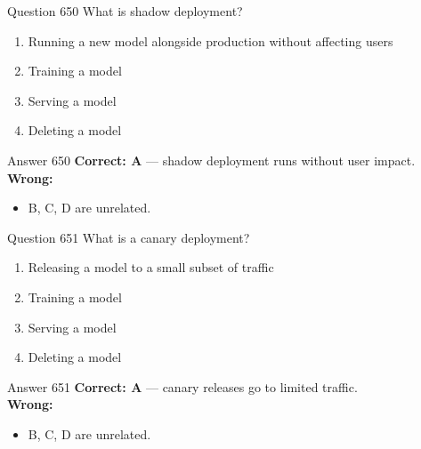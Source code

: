 \documentclass[aspectratio=169,11pt]{beamer}
\begin{document}
	\begin{frame}{Question 650}
		What is shadow deployment?
		\begin{enumerate}[label=\Alph*.]
			\item Running a new model alongside production without affecting users
			\item Training a model
			\item Serving a model
			\item Deleting a model
		\end{enumerate}
	\end{frame}
	\begin{frame}{Answer 650}
		\textbf{Correct: A} --- shadow deployment runs without user impact.\\
		\vspace{0.5em}
		\textbf{Wrong:}
		\begin{itemize}
			\item B, C, D are unrelated.
		\end{itemize}
	\end{frame}
	
	\begin{frame}{Question 651}
		What is a canary deployment?
		\begin{enumerate}[label=\Alph*.]
			\item Releasing a model to a small subset of traffic
			\item Training a model
			\item Serving a model
			\item Deleting a model
		\end{enumerate}
	\end{frame}
	\begin{frame}{Answer 651}
		\textbf{Correct: A} --- canary releases go to limited traffic.\\
		\vspace{0.5em}
		\textbf{Wrong:}
		\begin{itemize}
			\item B, C, D are unrelated.
		\end{itemize}
	\end{frame}
	
\end{document}
